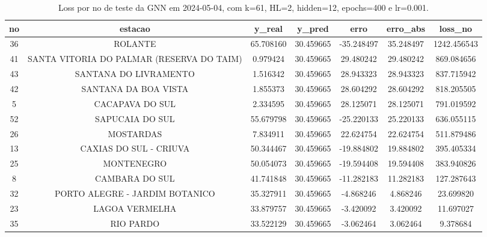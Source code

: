 \begin{table}[h]
\centering
\caption{Loss por no de teste da GNN em 2024-05-04, com k=61, HL=2, hidden=12, epochs=400 e lr=0.001.}
\label{tab:gnn_loss_k61_hl2_h12_e400_d20240504}
\begin{tabular}{ccccccc}
\toprule
no & estacao & y\_real & y\_pred & erro & erro\_abs & loss\_no \\
\midrule
36 & ROLANTE & 65.708160 & 30.459665 & -35.248497 & 35.248497 & 1242.456543 \\
41 & SANTA VITORIA DO PALMAR (RESERVA DO TAIM) & 0.979424 & 30.459665 & 29.480242 & 29.480242 & 869.084656 \\
43 & SANTANA DO LIVRAMENTO & 1.516342 & 30.459665 & 28.943323 & 28.943323 & 837.715942 \\
42 & SANTANA DA BOA VISTA & 1.855373 & 30.459665 & 28.604292 & 28.604292 & 818.205505 \\
5 & CACAPAVA DO SUL & 2.334595 & 30.459665 & 28.125071 & 28.125071 & 791.019592 \\
52 & SAPUCAIA DO SUL & 55.679798 & 30.459665 & -25.220133 & 25.220133 & 636.055115 \\
26 & MOSTARDAS & 7.834911 & 30.459665 & 22.624754 & 22.624754 & 511.879486 \\
13 & CAXIAS DO SUL - CRIUVA & 50.344467 & 30.459665 & -19.884802 & 19.884802 & 395.405334 \\
25 & MONTENEGRO & 50.054073 & 30.459665 & -19.594408 & 19.594408 & 383.940826 \\
8 & CAMBARA DO SUL & 41.741848 & 30.459665 & -11.282183 & 11.282183 & 127.287643 \\
32 & PORTO ALEGRE - JARDIM BOTANICO & 35.327911 & 30.459665 & -4.868246 & 4.868246 & 23.699820 \\
23 & LAGOA VERMELHA & 33.879757 & 30.459665 & -3.420092 & 3.420092 & 11.697027 \\
35 & RIO PARDO & 33.522129 & 30.459665 & -3.062464 & 3.062464 & 9.378684 \\
\bottomrule
\end{tabular}
\end{table}
